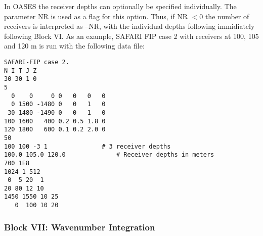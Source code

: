 In OASES the receiver depths can optionally be specified individually.
The parameter NR is used as a flag for this option. Thus, if NR $< 0$
the number of receivers is interpreted as --NR, with the individual
depths following immidiately following Block VI. As an example, SAFARI
FIP case 2 with receivers at 100, 105 and 120 m is run with the
following data file: 

\small
\begin{verbatim}
SAFARI-FIP case 2. 
N I T J Z
30 30 1 0
5
  0    0     0 0   0   0   0
  0 1500 -1480 0   0   1   0
 30 1480 -1490 0   0   1   0
100 1600   400 0.2 0.5 1.8 0
120 1800   600 0.1 0.2 2.0 0
50
100 100 -3 1		       # 3 receiver depths
100.0 105.0 120.0              # Receiver depths in meters
700 1E8  
1024 1 512
 0  5 20  1
20 80 12 10
1450 1550 10 25
   0  100 10 20
\end{verbatim}
\normalsize 


\subsubsection{Block VII: Wavenumber Integration}

